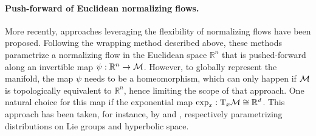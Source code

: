 \paragraph{Push-forward of Euclidean normalizing flows.}
More recently, approaches leveraging the flexibility of normalizing flows
\citep{papamakarios2019normalizing} have been proposed.
Following the wrapping method described above, these methods 
parametrize a normalizing flow in the Euclidean space $\mathbb{R}^n$ that is pushed-forward along an invertible map $\psi: \mathbb{R}^n \rightarrow \mathcal M$.
However, to globally represent the manifold, the map $\psi$ needs to be a homeomorphism, which can only happen if $\mathcal M$ is topologically equivalent to $\mathbb{R}^n$, hence limiting the scope of that approach.
One natural choice for this map if the exponential map $\exp_x: \mathrm{T}_x \mathcal M \cong \mathbb{R}^d$. %
This approach has been taken, for instance, by \cite{falorsi2019reparameterizing} and \cite{bose2020latent}, respectively parametrizing distributions on Lie groups and hyperbolic space.
%

